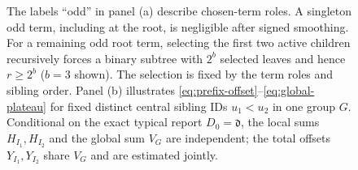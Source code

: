 \begin{figure}[p]
\caption{The labels ``odd'' in panel (a) describe chosen-term roles.
A singleton odd term, including at the root, is negligible after signed
smoothing.  For a remaining odd root term, selecting the first two active
children recursively forces a binary subtree with $2^b$ selected leaves
and hence $r\ge2^b$ ($b=3$ shown).  The selection is fixed by the term roles
and sibling order.  Panel (b) illustrates
\eqref{eq:prefix-offset}--\eqref{eq:global-plateau} for fixed distinct
central sibling IDs $u_1<u_2$ in one group $G$.  Conditional on the exact
typical report $D_0=\mathfrak d$, the local sums $H_{I_1},H_{I_2}$ and the
global sum $V_G$ are independent; the total offsets $Y_{I_1},Y_{I_2}$ share
$V_G$ and are estimated jointly.}
\label{fig:forced-subtree-jitter}
\end{figure}
